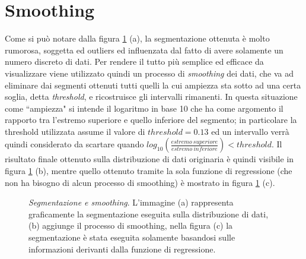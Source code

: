 \section{Smoothing}

Come si può notare dalla figura \ref{fig:segmentation} (a), la segmentazione ottenuta è molto rumorosa, soggetta ed outliers ed influenzata dal fatto di avere solamente un numero discreto di dati. 
Per rendere il tutto più semplice ed efficace da visualizzare viene utilizzato quindi un processo di \textit{smoothing} dei dati, che va ad eliminare dai segmenti ottenuti tutti quelli la cui ampiezza sta sotto ad una certa soglia, detta \textit{threshold}, e ricostruisce gli intervalli rimanenti. In questa situazione come ``ampiezza" si intende il logaritmo in base 10 che ha come argomento il rapporto tra l'estremo superiore e quello inferiore del segmento; in particolare la threshold utilizzata assume il valore di $threshold=0.13$ ed un intervallo verrà quindi considerato da scartare quando $log_{10}\left(\frac{estremo\ superiore}{estremo\ inferiore} \right) < threshold$.
Il risultato finale ottenuto sulla distribuzione di dati originaria è quindi visibile in figura \ref{fig:segmentation} (b), mentre quello ottenuto tramite la sola funzione di regressione (che non ha bisogno di alcun processo di smoothing) è mostrato in figura \ref{fig:segmentation} (c).

\begin{figure}[ht]
    \centering
    \quad
    \quad
    \quad
    \caption{\textit{Segmentazione e smoothing}. L'immagine (a) rappresenta graficamente la segmentazione eseguita sulla distribuzione di dati, (b) aggiunge il processo di smoothing, nella figura (c) la segmentazione è stata eseguita solamente basandosi sulle informazioni derivanti dalla funzione di regressione.}
    \label{fig:segmentation}
\end{figure}


